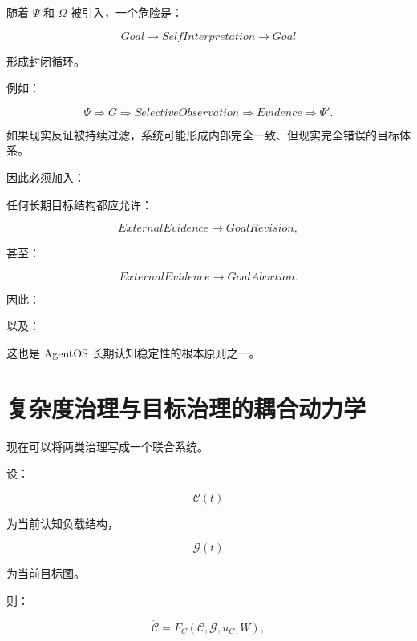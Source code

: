 随着 $\Psi$ 和 $\Omega$ 被引入，一个危险是：

\[
Goal
\rightarrow
SelfInterpretation
\rightarrow
Goal
\]

形成封闭循环。

例如：

\[
\Psi
\Rightarrow
G
\Rightarrow
SelectiveObservation
\Rightarrow
Evidence
\Rightarrow
\Psi'.
\]

如果现实反证被持续过滤，系统可能形成内部完全一致、但现实完全错误的目标体系。

因此必须加入：

\begin{statementbox}
\centering
{}
\end{statementbox}

任何长期目标结构都应允许：

\[
ExternalEvidence
\rightarrow
GoalRevision,
\]

甚至：

\[
ExternalEvidence
\rightarrow
GoalAbortion.
\]

因此：

\begin{statementbox}
\centering
{}
\end{statementbox}

以及：

\begin{statementbox}
\centering
{}
\end{statementbox}

这也是 AgentOS 长期认知稳定性的根本原则之一。


\section{复杂度治理与目标治理的耦合动力学}

现在可以将两类治理写成一个联合系统。

设：

\[
\mathcal C(t)
\]

为当前认知负载结构，

\[
\mathcal G(t)
\]

为当前目标图。

则：

\[
\dot{\mathcal C}
=
F_C(
\mathcal C,
\mathcal G,
u_C,
W
),
\]


